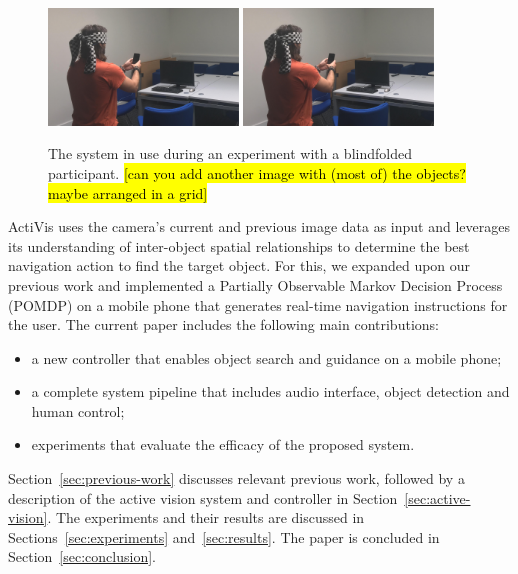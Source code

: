 \documentclass[runningheads]{llncs}
\DeclareRobustCommand{\tofix}[1]{{\sethlcolor{yellow}\hl{[#1]}}}
\begin{document}
\begin{figure}
  \centering
  \includegraphics[width=0.45\textwidth]{figures/system_use.png} \hfil
  \includegraphics[width=0.45\textwidth]{figures/system_use.png}
  \caption{The system in use during an experiment with a blindfolded participant. \tofix{can you add another image with (most of) the objects? maybe arranged in a grid} }\label{fig:system-in-use}
\end{figure}

ActiVis uses the camera's current and previous image data as input and leverages its understanding of inter-object spatial relationships to determine the best navigation action to find the target object.
For this, we expanded upon our previous work and implemented a Partially Observable Markov Decision Process (POMDP) on a mobile phone that generates real-time navigation instructions for the user.
The current paper includes the following main contributions:

\begin{itemize}
  \item a new controller that enables object search and guidance on a mobile phone;
  \item a complete system pipeline that includes audio interface, object detection and human control;
  \item experiments that evaluate the efficacy of the proposed system.
\end{itemize}

Section~\ref{sec:previous-work} discusses relevant previous work, followed by a description of the active vision system and controller in Section~\ref{sec:active-vision}.
The experiments and their results are discussed in Sections~\ref{sec:experiments} and~\ref{sec:results}.
The paper is concluded in Section~\ref{sec:conclusion}.
\end{document}
